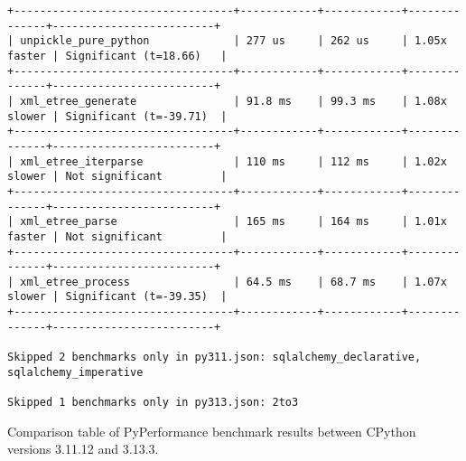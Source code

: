 \begin{code}
\begin{verbatim}
+----------------------------------+------------+------------+--------------+-------------------------+
| unpickle_pure_python             | 277 us     | 262 us     | 1.05x faster | Significant (t=18.66)   |
+----------------------------------+------------+------------+--------------+-------------------------+
| xml_etree_generate               | 91.8 ms    | 99.3 ms    | 1.08x slower | Significant (t=-39.71)  |
+----------------------------------+------------+------------+--------------+-------------------------+
| xml_etree_iterparse              | 110 ms     | 112 ms     | 1.02x slower | Not significant         |
+----------------------------------+------------+------------+--------------+-------------------------+
| xml_etree_parse                  | 165 ms     | 164 ms     | 1.01x faster | Not significant         |
+----------------------------------+------------+------------+--------------+-------------------------+
| xml_etree_process                | 64.5 ms    | 68.7 ms    | 1.07x slower | Significant (t=-39.35)  |
+----------------------------------+------------+------------+--------------+-------------------------+

Skipped 2 benchmarks only in py311.json: sqlalchemy_declarative, sqlalchemy_imperative

Skipped 1 benchmarks only in py313.json: 2to3
    \end{verbatim}
    \caption{Comparison table of PyPerformance benchmark results between CPython versions 3.11.12 and 3.13.3.}
    \label{listing:pyperformance-results-311-313}
\end{code}


